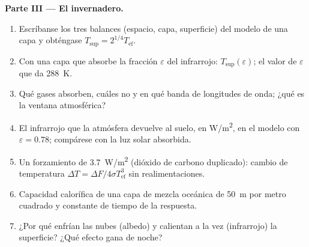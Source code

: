 \begin{problem}
\textbf{Parte III --- El invernadero.}
\begin{enumerate}[resume]
  \item Escríbanse los tres balances (espacio, capa, superficie) del
        modelo de una capa y obténgase $T_{\text{sup}} = 2^{1/4}T_{\text{ef}}$.
  \item Con una capa que absorbe la fracción $\varepsilon$ del
        infrarrojo: $T_{\text{sup}}(\varepsilon)$; el valor de $\varepsilon$
        que da \qty{288}{K}.
  \item Qué gases absorben, cuáles no y en qué banda de longitudes
        de onda; ¿qué es la ventana atmosférica?
  \item El infrarrojo que la atmósfera devuelve al suelo,
        en \unit{W/m^2}, en el modelo con $\varepsilon = 0.78$; compárese con
        la luz solar absorbida.
  \item Un forzamiento de \qty{3.7}{W/m^2} (dióxido de carbono duplicado):
        cambio de temperatura $\Delta T = \Delta F/4\sigma T_{\text{ef}}^3$
        sin realimentaciones.
  \item Capacidad calorífica de una capa de mezcla oceánica de \qty{50}{m} por metro
        cuadrado y constante de tiempo de la respuesta.
  \item ¿Por qué enfrían las nubes (albedo) y calientan a la vez (infrarrojo) la
        superficie? ¿Qué efecto gana de noche?
\end{enumerate}


\end{problem}

